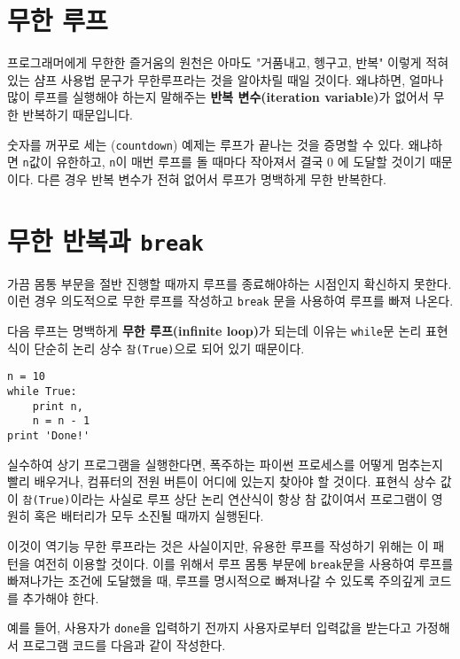 \section{  무한 루프}

프로그래머에게 무한한 즐거움의 원천은 아마도 "거품내고, 헹구고, 반복" 이렇게 적혀있는 샴프 사용법 문구가 무한루프라는 것을 알아차릴 때일 것이다.
왜냐하면, 얼마나 많이 루프를 실행해야 하는지 말해주는 {\bf 반복 변수(iteration variable)}가 없어서 무한 반복하기 때문입니다.


숫자를 꺼꾸로 세는 ({\tt countdown}) 예제는 루프가 끝나는 것을 증명할 수 있다.
왜냐하면 {\tt n}값이 유한하고, {\tt n}이 매번 루프를 돌 때마다 작아져서 결국 0 에 도달할 것이기 때문이다. 
다른 경우 반복 변수가 전혀 없어서 루프가 명백하게 무한 반복한다.

\section{  무한 반복과 {\tt break}}

가끔 몸통 부문을 절반 진행할 때까지 루프를 종료해야하는 시점인지 확신하지 못한다.
이런 경우 의도적으로 무한 루프를 작성하고 {\tt break} 문을 사용하여 루프를 빠져 나온다.

다음 루프는 명백하게 {\bf 무한 루프(infinite loop)}가 되는데 이유는 {\tt while}문 논리 표현식이 단순히 논리 상수 {\tt 참(True)}으로 되어 있기 때문이다. 

\beforeverb
\begin{verbatim}
n = 10
while True:
    print n, 
    n = n - 1
print 'Done!'
\end{verbatim}
\afterverb
%

실수하여 상기 프로그램을 실행한다면, 폭주하는 파이썬 프로세스를 어떻게 멈추는지 빨리 배우거나, 컴퓨터의 전원 버튼이 어디에 있는지 찾아야 할 것이다.
표현식 상수 값이 {\tt 참(True)}이라는 사실로 루프 상단 논리 연산식이 항상 참 값이여서 프로그램이 영원히 혹은 배터리가 모두 소진될 때까지 실행된다.

이것이 역기능 무한 루프라는 것은 사실이지만, 유용한 루프를 작성하기 위해는 이 패턴을 여전히 이용할 것이다. 
이를 위해서 루프 몸통 부문에 {\tt break}문을 사용하여 루프를 빠져나가는 조건에 도달했을 때, 
루프를 명시적으로 빠져나갈 수 있도록 주의깊게 코드를 추가해야 한다.

예를 들어, 사용자가 {\tt done}을 입력하기 전까지 사용자로부터 입력값을 받는다고 가정해서 프로그램 코드를 다음과 같이 작성한다.

